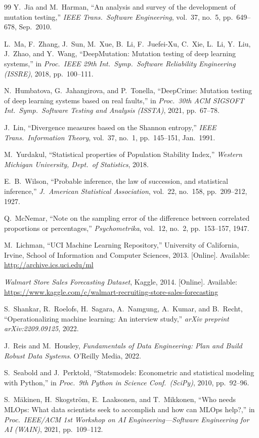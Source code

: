 \documentclass[journal]{IEEEtran}
\begin{document}
\begin{thebibliography}{99}
Y.~Jia and M.~Harman,
``An analysis and survey of the development of mutation testing,''
\emph{IEEE Trans.\ Software Engineering}, vol.~37, no.~5,
pp.~649--678, Sep.\ 2010.

L.~Ma, F.~Zhang, J.~Sun, M.~Xue, B.~Li, F.~Juefei-Xu, C.~Xie,
L.~Li, Y.~Liu, J.~Zhao, and Y.~Wang,
``DeepMutation: Mutation testing of deep learning systems,''
in \emph{Proc.\ IEEE 29th Int.\ Symp.\ Software Reliability
Engineering (ISSRE)}, 2018, pp.~100--111.

N.~Humbatova, G.~Jahangirova, and P.~Tonella,
``DeepCrime: Mutation testing of deep learning systems based on
real faults,''
in \emph{Proc.\ 30th ACM SIGSOFT Int.\ Symp.\ Software Testing
and Analysis (ISSTA)}, 2021, pp.~67--78.

J.~Lin,
``Divergence measures based on the Shannon entropy,''
\emph{IEEE Trans.\ Information Theory}, vol.~37, no.~1,
pp.~145--151, Jan.\ 1991.

M.~Yurdakul,
``Statistical properties of Population Stability Index,''
\emph{Western Michigan University, Dept.\ of Statistics}, 2018.

E.~B.~Wilson,
``Probable inference, the law of succession, and statistical inference,''
\emph{J.\ American Statistical Association}, vol.~22, no.~158,
pp.~209--212, 1927.

Q.~McNemar,
``Note on the sampling error of the difference between correlated
proportions or percentages,''
\emph{Psychometrika}, vol.~12, no.~2, pp.~153--157, 1947.

M.~Lichman,
``UCI Machine Learning Repository,''
University of California, Irvine, School of Information and
Computer Sciences, 2013. [Online].
Available: \url{http://archive.ics.uci.edu/ml}

\emph{Walmart Store Sales Forecasting Dataset},
Kaggle, 2014. [Online].
Available: \url{https://www.kaggle.com/c/walmart-recruiting-store-sales-forecasting}

S.~Shankar, R.~Roelofs, H.~Sagara, A.~Namgung, A.~Kumar, and B.~Recht,
``Operationalizing machine learning: An interview study,''
\emph{arXiv preprint arXiv:2209.09125}, 2022.

J.~Reis and M.~Housley,
\emph{Fundamentals of Data Engineering: Plan and Build Robust Data Systems}.
O'Reilly Media, 2022.

S.~Seabold and J.~Perktold,
``Statsmodels: Econometric and statistical modeling with Python,''
in \emph{Proc.\ 9th Python in Science Conf.\ (SciPy)}, 2010,
pp.~92--96.

S.~M\"{a}kinen, H.~Skogstr\"{o}m, E.~Laaksonen, and T.~Mikkonen,
``Who needs MLOps: What data scientists seek to accomplish and how
can MLOps help?,''
in \emph{Proc.\ IEEE/ACM 1st Workshop on AI Engineering---Software
Engineering for AI (WAIN)}, 2021, pp.~109--112.

\end{thebibliography}
\end{document}
